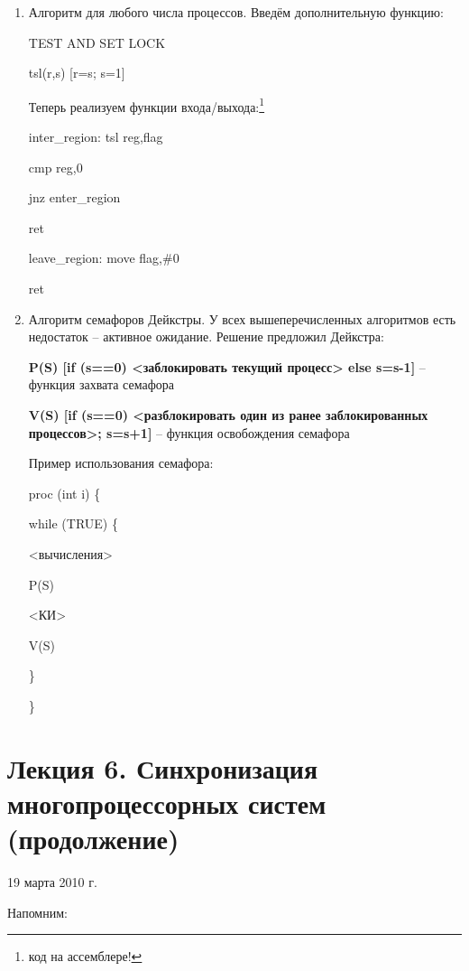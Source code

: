 \documentclass[a4paper,12pt]{article}
\begin{document}
\begin{enumerate}
		{\bf {void enter\_region(int i) \{
			
			\qquad int other;
			
			\qquad other=1-i;
			
			\qquad flag[i]=TRUE;
			
			\qquad turn=i;
			
			\qquad while((turn==i)\&\&(flag[other]==TRUE)) ;
			
		\}
		\newline
		void leave\_region(int i) \{
		
			\qquad flag[i]=FALSE;
			
		\} }}
		\item Алгоритм для любого числа процессов. Введём дополнительную функцию:
		
		{\bf {TEST AND SET LOCK
		
			\qquad tsl(r,s) [r=s; s=1] }}
		\newline
		Теперь реализуем функции входа/выхода:\footnote{код на ассемблере!}
		
		{\bf {inter\_region: tsl reg,flag
		
			\qquad cmp reg,0
			
			\qquad jnz enter\_region
			
			\qquad ret
			
			leave\_region: move flag,\#0
			
			\qquad ret}}
		\item Алгоритм семафоров Дейкстры. У всех вышеперечисленных алгоритмов есть недостаток 
		-- активное ожидание. Решение предложил Дейкстра:
		
		{\bf {P(S) [if (s==0) <заблокировать текущий процесс> else s=s-1]}} -- функция
		захвата семафора
		
		{\bf {V(S) [if (s==0) <разблокировать один из ранее заблокированных процессов>; s=s+1]}}
		-- функция освобождения семафора
		
		Пример использования семафора:
		
		{\bf {proc (int i) \{
		
			\qquad while (TRUE) \{
			
				\qquad {}
				
				\qquad \qquad P(S)
				
				\qquad {}
				
				\qquad \qquad V(S)
			
			\qquad \}
		
		\} }}
	\end{enumerate}
	\section{\bf Лекция 6. Синхронизация многопроцессорных систем (продолжение)}
	\centerline{19 марта 2010 г.}
	Напомним:
	
\end{document}
